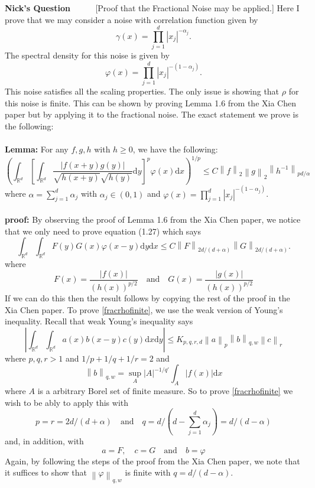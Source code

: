 \documentclass[a4paper,11pt]{article}
\numberwithin{equation}{section}
\theoremstyle{plain}
\theoremstyle{definition}
\newcommand{\ud}{\ensuremath{\mathrm{d} }}
\newcommand{\Norm}[1]{\left\|  #1   \right\|}
\newcommand{\R}{\mathbb{R}}
\newcounter{NQ}
\newenvironment{NickQuestion}[1][] %
{\refstepcounter{NQ}
	\begin{mdframed}[backgroundcolor=lightgray]\textbf{Nick's Question \theNQ \: #1~~}~~~\noindent}%
	{\end{mdframed}}
\numberwithin{NQ}{section}
\numberwithin{LQ}{section}
\numberwithin{ZQ}{section}
\begin{document}
	\begin{NickQuestion}\label{fracnoise}[Proof that the Fractional Noise may be applied.]
		Here I prove that we may consider a noise with correlation function given by
		\[
		\gamma(x) = \prod_{j = 1}^d |x_j|^{-\alpha_j}.
		\]
		The spectral density for this noise is given by
		\[
		\varphi(x) = \prod_{j = 1}^d |x_j|^{-(1-\alpha_j)}.
		\]
		This noise satisfies all the scaling properties. The only issue is showing that $\rho$ for this noise is finite. This can be shown by proving Lemma 1.6 from the Xia Chen paper but by applying it to the fractional noise. The exact statement we prove is the following:
		\\ \\
		\textbf{Lemma:} For any $f,g,h$ with $h\ge0$, we have the following:
		\[
		\left( \int_{\R^d} \left[ \int_{\R^d} \dfrac{|f(x+y)g(y)|}{\sqrt{h(x+y)}\sqrt{h(y)}} \ud y \right]^p \varphi(x) \ud x \right)^{1/p} \le C \Norm{f}_2 \Norm{g}_2 \Norm{h^{-1}}_{pd/\alpha}
		\]
		where $\alpha = \sum_{j=1}^d \alpha_j$ with $\alpha_j \in (0,1)$ and $\varphi(x) = \prod_{j =1}^d |x_j|^{-(1-\alpha_j)}$.
		\\ \\
		\textbf{proof:} By observing the proof of Lemma 1.6 from the Xia Chen paper, we notice that we only need to prove equation (1.27) which says
		\begin{equation}\label{fracrhofinite}
		\int_{\R^d}\int_{\R^d} F(y)G(x)\varphi(x-y) \ud y \ud x \le C \Norm{F}_{2d/(d+\alpha)} \Norm{G}_{2d/(d+ \alpha)}.
		\end{equation}
		where
		\[
		F(x) = \frac{|f(x)|}{(h(x))^{p/2}} \quad \text{and} \quad G(x) = \frac{|g(x)|}{(h(x))^{p/2}}
		\]
		If we can do this then the result follows by copying the rest of the proof in the Xia Chen paper. To prove \ref{fracrhofinite}, we use the weak version of Young's inequality. Recall that weak Young's inequality says
		\[
		\left|	\int_{\R^d}\int_{\R^d}a(x)b(x-y)c(y) \ud x \ud y \right| \le K_{p,q,r,d} \Norm{a}_p\Norm{b}_{q,w}\Norm{c}_r
		\]
		where $p,q,r >1$ and $1/p + 1/q + 1/r =2$ and
		\[
		\Norm{b}_{q,w} = \sup_{A} |A|^{-1/q'} \int_A |f(x)| \ud x
		\]
		where $A$ is a arbitrary Borel set of finite measure. So to prove \ref{fracrhofinite} we wish to be ably to apply this with
		\[
		p=r=2d/(d+\alpha) \quad \text{and} \quad q= d/\left(d-\sum_{j=1}^d\alpha_j \right) = d/(d-\alpha)
		\]
		and, in addition, with
		\[
		a=F, \quad c=G \quad \text{and} \quad b=\varphi
		\]
		Again, by following the steps of the proof from the Xia Chen paper, we note that it suffices to show that $\Norm{\varphi}_{q,w}$ is finite with $q = d/(d-\alpha)$.


\end{NickQuestion}
\end{document}
